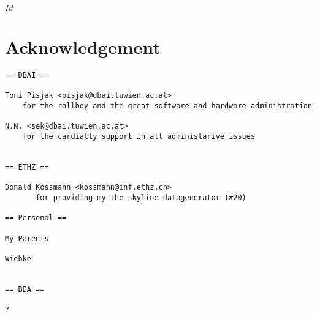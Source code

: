 
\svnInfo $Id$

\chapter*{Acknowledgement\revision}

\begin{verbatim}
== DBAI ==

Toni Pisjak <pisjak@dbai.tuwien.ac.at>
	for the rollboy and the great software and hardware administration

N.N. <sek@dbai.tuwien.ac.at>
	for the cardially support in all administarive issues


== ETHZ ==

Donald Kossmann <kossmann@inf.ethz.ch> 
       for providing my the skyline datagenerator (#20)

== Personal ==

My Parents

Wiebke


== BDA ==

?
\end{verbatim}
